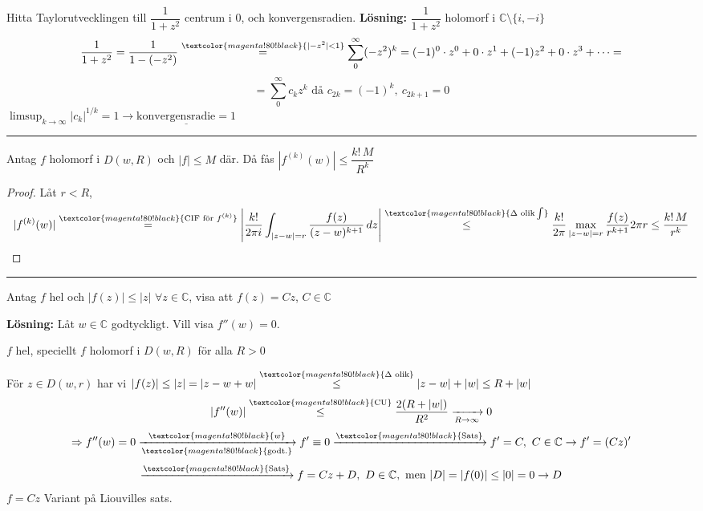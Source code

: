 \begin{example}
Hitta Taylorutvecklingen till $\dfrac{1}{1 + z^2}$ centrum i $0$, och konvergensradien.
\textbf{Lösning:} $\dfrac{1}{1 + z^2}$ holomorf i $\mathbb{C} \setminus \{i, -i\}$
\[ \frac{1}{1 + z^2} = \frac{1}{1 - (-z^2)} \overset{\textcolor{magenta!80!black}{|-z^2| < 1}}{=} \sum_0^\infty (-z^2)^k = (-1)^0 \cdot z^0 + 0 \cdot z^1 + (-1)z^2 + 0 \cdot z^3 + \dots = \]
\[ = \sum_0^\infty c_k z^k \text{ då } c_{2k} = (-1)^k,\ c_{2k+1} = 0 \]
$\displaystyle\limsup_{k \to \infty} |c_k|^{1/k} = 1 \to \underline{\text{konvergensradie} = 1}$
\end{example}

\noindent\rule{\linewidth}{0.4pt}

\begin{theorem}
Antag $f$ holomorf i $D(w, R)$ och $|f| \le M$ där. Då fås $|f^{(k)}(w)| \le \dfrac{k!\,M}{R^k}$
\end{theorem}
\begin{proof}
Låt $r < R$,
\[ |f^{(k)}(w)| \overset{\textcolor{magenta!80!black}{\text{CIF för } f^{(k)}}}{=} \left| \frac{k!}{2\pi i} \int_{|z - w| = r} \frac{f(z)}{(z - w)^{k+1}}\,dz \right| \overset{\textcolor{magenta!80!black}{\Delta \text{ olik} \int}}{\le} \frac{k!}{2\pi} \max_{|z - w| = r} \frac{f(z)}{r^{k+1}} 2\pi r \le \frac{k!\,M}{r^k} \]
\end{proof}

\noindent\rule{\linewidth}{0.4pt}

\begin{example}
Antag $f$ hel och $|f(z)| \le |z|$ $\forall z \in \mathbb{C}$, visa att $f(z) = Cz$, $C \in \mathbb{C}$

\textbf{Lösning:} Låt $w \in \mathbb{C}$ godtyckligt. Vill visa $f''(w) = 0$.

$f$ hel, speciellt $f$ holomorf i $D(w, R)$ för alla $R > 0$

För $z \in D(w, r)$ har vi $|f(z)| \le |z| = |z - w + w| \overset{\textcolor{magenta!80!black}{\Delta \text{ olik}}}{\le} |z - w| + |w| \le R + |w|$
\[ |f''(w)| \overset{\textcolor{magenta!80!black}{\text{CU}}}{\le} \frac{2(R + |w|)}{R^2} \xrightarrow[R \to \infty]{} 0 \]
\[ \Rightarrow f''(w) = 0 \xrightarrow[\textcolor{magenta!80!black}{\text{godt.}}]{\textcolor{magenta!80!black}{w}} f' \equiv 0 \xrightarrow{\textcolor{magenta!80!black}{\text{Sats}}} f' = C,\ C \in \mathbb{C} \to f' = (Cz)' \]
\[ \xrightarrow{\textcolor{magenta!80!black}{\text{Sats}}} f = Cz + D,\ D \in \mathbb{C}, \text{ men } |D| = |f(0)| \le |0| = 0 \to D \]
$f = Cz$ \qquad \textcolor{magenta!80!black}{Variant på Liouvilles sats.}
\end{example}
